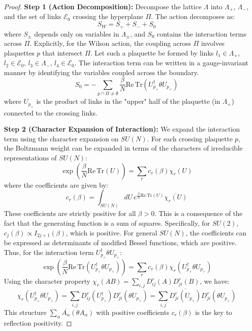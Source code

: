\begin{proof}
\textbf{Step 1 (Action Decomposition):}
Decompose the lattice $\Lambda$ into $\Lambda_+$, $\Lambda_-$, and the set of links $\mathcal{E}_0$ crossing the hyperplane $\Pi$. The action decomposes as:
\begin{equation}
S_W = S_+ + S_- + S_0
\end{equation}
where $S_\pm$ depends only on variables in $\Lambda_\pm$, and $S_0$ contains the interaction terms across $\Pi$.
Explicitly, for the Wilson action, the coupling across $\Pi$ involves plaquettes $p$ that intersect $\Pi$. Let such a plaquette be formed by links $l_1 \in \Lambda_+$, $l_2 \in \mathcal{E}_0$, $l_3 \in \Lambda_-$, $l_4 \in \mathcal{E}_0$. The interaction term can be written in a gauge-invariant manner by identifying the variables coupled across the boundary.
\begin{equation}
S_0 = -\sum_{p \cap \Pi \neq \emptyset} \frac{\beta}{N} \mathrm{Re}\,\mathrm{Tr}(U_{p_+}^\dagger \theta U_{p_+})
\end{equation}
where $U_{p_+}$ is the product of links in the "upper" half of the plaquette (in $\Lambda_+$) connected to the crossing links.

\textbf{Step 2 (Character Expansion of Interaction):}
We expand the interaction term using the character expansion on $SU(N)$. For each crossing plaquette $p$, the Boltzmann weight can be expanded in terms of the characters of irreducible representations of $SU(N)$:
\begin{equation}
\exp\left(\frac{\beta}{N}\mathrm{Re}\,\mathrm{Tr}(U)\right) = \sum_r c_r(\beta) \chi_r(U)
\end{equation}
where the coefficients are given by:
\begin{equation}
c_r(\beta) = \int_{SU(N)} dU \, e^{\frac{\beta}{N}\mathrm{Re}\,\mathrm{Tr}(U)} \overline{\chi_r(U)}
\end{equation}
These coefficients are strictly positive for all $\beta > 0$. This is a consequence of the fact that the generating function is a sum of squares. Specifically, for $SU(2)$, $c_j(\beta) \propto I_{2j+1}(\beta)$, which is positive. For general $SU(N)$, the coefficients can be expressed as determinants of modified Bessel functions, which are positive.
Thus, for the interaction term $U_{p_+}^\dagger \theta U_{p_+}$:
\begin{equation}
\exp\left(\frac{\beta}{N}\mathrm{Re}\,\mathrm{Tr}(U_{p_+}^\dagger \theta U_{p_+})\right) = \sum_r c_r(\beta) \chi_r(U_{p_+}^\dagger \theta U_{p_+})
\end{equation}
Using the character property $\chi_r(AB) = \sum_{i,j} D_{ij}^r(A) D_{ji}^r(B)$, we have:
\begin{equation}
\chi_r(U_{p_+}^\dagger \theta U_{p_+}) = \sum_{i,j} D_{ij}^r(U_{p_+}^\dagger) D_{ji}^r(\theta U_{p_+}) = \sum_{i,j} \overline{D_{ji}^r(U_{p_+})} D_{ji}^r(\theta U_{p_+})
\end{equation}
This structure $\sum_\alpha \overline{A_\alpha} (\theta A_\alpha)$ with positive coefficients $c_r(\beta)$ is the key to reflection positivity.


\end{proof}

